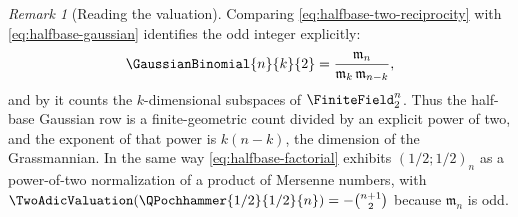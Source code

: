 \documentclass[11pt,a4paper,oneside,openany]{book}
\theoremstyle{definition}
\theoremstyle{remark}
\newtheorem{remark}[remark]{Remark}
\begin{document}
\begin{remark}[Reading the valuation]\label{rem:halfbase-valuation-reading}
Comparing \eqref{eq:halfbase-two-reciprocity} with \eqref{eq:halfbase-gaussian} identifies the odd integer explicitly:
\[
 \GaussianBinomial{n}{k}{2}=\frac{\mathfrak m_n}{\mathfrak m_k\,\mathfrak m_{n-k}},
\]
and by  it counts the $k$-dimensional subspaces of $\FiniteField_{2}^{n}$.  Thus the half-base Gaussian row is a finite-geometric count divided by an explicit power of two, and the exponent of that power is $k(n-k)$, the dimension of the Grassmannian.  In the same way \eqref{eq:halfbase-factorial} exhibits $(1/2;1/2)_n$ as a power-of-two normalization of a product of Mersenne numbers, with $\TwoAdicValuation\!\left(\QPochhammer{1/2}{1/2}{n}\right)=-\binom{n+1}{2}$ because $\mathfrak m_n$ is odd.
\end{remark}
\end{document}
